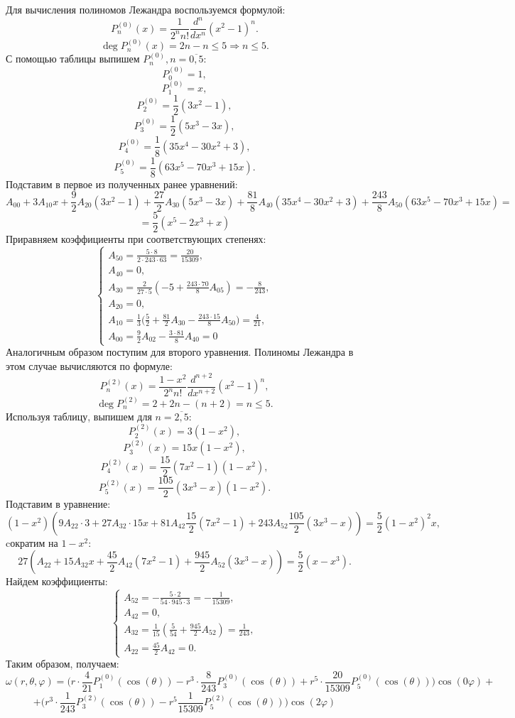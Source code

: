 \documentclass[11pt]{article}
\begin{document}
 Для вычисления полиномов Лежандра воспользуемся формулой:
 $$P_n^{(0)}(x)=\frac{1}{2^nn!}\frac{d^n}{dx^n}(x^2-1)^n.$$
 $$\deg P_n^{(0)}(x)=2n-n\leq5\Rightarrow n\leq5.$$
 С помощью таблицы выпишем $P_n^{(0)}, n=\overline{0,5}:$
 $$P_0^{(0)}=1,$$
 $$P_1^{(0)}=x,$$
 $$P_2^{(0)}=\frac{1}{2}(3x^2-1),$$
 $$P_3^{(0)}=\frac{1}{2}(5x^3-3x),$$
 $$P_4^{(0)}=\frac{1}{8}(35x^4-30x^2+3),$$
 $$P_5^{(0)}=\frac{1}{8}(63x^5-70x^3+15x).$$
 Подставим в первое из полученных ранее уравнений:
 $$A_{00}+3A_{10}x+\frac{9}{2}A_{20}(3x^2-1)+\frac{27}{2}A_{30}(5x^3-3x)+\frac{81}{8}A_{40}(35x^4-30x^2+3)+\frac{243}{8}A_{50}(63x^5-70x^3+15x)=$$$$=\frac{5}{2}(x^5-2x^3+x)$$
 Приравняем коэффициенты при соответствующих степенях:
 $$\begin{cases}
     A_{50}=\frac{5\cdot8}{2\cdot243\cdot63}=\frac{20}{15309},\\
     A_{40}=0,\\
     A_{30}=\frac{2}{27\cdot5}(-5+\frac{243\cdot 70}{8}A_{05})=-\frac{8}{243},\\
     A_{20}=0,\\
     A_{10}=\frac{1}{3}\Big(\frac{5}{2}+\frac{81}{2}A_{30}-\frac{243\cdot15}{8}A_{50}\Big)=\frac{4}{21},\\
     A_{00}=\frac{9}{2}A_{02}-\frac{3\cdot81}{8}A_{40}=0
 \end{cases}$$
  Аналогичным образом поступим для второго уравнения. Полиномы Лежандра в этом случае вычисляются по формуле:
 $$P_n^{(2)}(x)=\frac{1-x^2}{2^n n!}\frac{d^{n+2}}{dx^{n+2}}(x^2-1)^n,$$
 $$\deg P_n^{(2)}=2+2n-(n+2)=n\leq5.$$
 Используя таблицу, выпишем для $n=\overline{2,5}:$
 $$P_2^{(2)}(x)=3(1-x^2),$$
 $$P_3^{(2)}(x)=15x(1-x^2),$$
 $$P_4^{(2)}(x)=\frac{15}{2}(7x^2-1)(1-x^2),$$
 $$P_5^{(2)}(x)=\frac{105}{2}(3x^3-x)(1-x^2).$$
 Подставим в уравнение:
 $$(1-x^2)(9A_{22}\cdot3+27A_{32}\cdot15x+81A_{42}\frac{15}{2}(7x^2-1)+243A_{52}\frac{105}{2}(3x^3-x))=\frac{5}{2}(1-x^2)^2x,$$
 cократим на $1-x^2$:
 $$27(A_{22}+15A_{32}x+\frac{45}{2}A_{42}(7x^2-1)+\frac{945}{2}A_{52}(3x^3-x))=\frac{5}{2}(x-x^3).$$
 Найдем коэффициенты:
 $$\begin{cases}
     A_{52}=-\frac{5\cdot2}{54\cdot945\cdot3}=-\frac{1}{15309},\\
     A_{42}=0,\\
     A_{32}=\frac{1}{15}(\frac{5}{54}+\frac{945}{2}A_{52})=\frac{1}{243},\\
     A_{22}=\frac{45}{2}A_{42}=0.
 \end{cases}$$
 Таким образом, получаем:
 $$\omega(r,\theta, \varphi)=\Big(r\cdot\frac{4}{21}P_1^{(0)}(\cos(\theta))-r^3\cdot\frac{8}{243}P_3^{(0)}(\cos(\theta))+r^5\cdot\frac{20}{15309}P_5^{(0)}(\cos(\theta))\Big)\cos(0\varphi)+$$$$+\Big(r^3\cdot\frac{1}{243}P_3^{(2)}(\cos(\theta))-r^5\frac{1}{15309}P_5^{(2)}(\cos(\theta))\Big)\cos(2\varphi)$$
\end{document}
